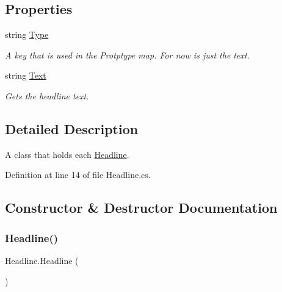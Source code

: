 \subsection*{Properties}
\begin{DoxyCompactItemize}
\item 
string \hyperlink{class_headline_a5de42ed76f528326548dbd3b82141912}{Type}
\begin{DoxyCompactList}\small\item\em A key that is used in the Protptype map. For now is just the text. \end{DoxyCompactList}\item 
string \hyperlink{class_headline_abb34627258821c45a21d1dbae3ad76af}{Text}
\begin{DoxyCompactList}\small\item\em Gets the headline text. \end{DoxyCompactList}\end{DoxyCompactItemize}


\subsection{Detailed Description}
A class that holds each \hyperlink{class_headline}{Headline}. 



Definition at line 14 of file Headline.\+cs.



\subsection{Constructor \& Destructor Documentation}
\mbox{\label{class_headline_ac218488286848b446e68f3d6dda5d46c}} 
\subsubsection{\texorpdfstring{Headline()}{Headline()}\hspace{0.1cm}{\footnotesize\ttfamily [1/2]}}
{\footnotesize\ttfamily Headline.\+Headline (\begin{DoxyParamCaption}{ }\end{DoxyParamCaption})}



